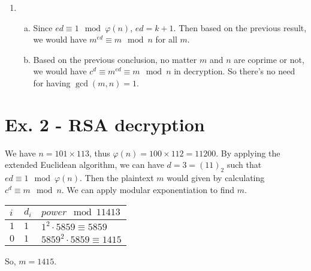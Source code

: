 \documentclass[11pt,a4paper]{article}
\begin{document}
\begin{enumerate}
\item \begin{enumerate}[a)]
\item Since $ed \equiv 1 \mod \varphi(n)$, $ed = k + 1$. Then based on the previous result, we would have $m^{ed} \equiv m \mod n$ for all $m$.

\item Based on the previous conclusion, no matter $m$ and $n$ are coprime or not, we would have $c^{d} \equiv m^{ed} \equiv m \mod n$ in decryption. So there's no need for having $\gcd(m,n) = 1$.
\end{enumerate}
\end{enumerate}



\section*{Ex. 2 - RSA decryption}
\par We have $n = 101 \times 113$, thus $\varphi(n) = 100 \times 112 = 11200$. By applying the extended Euclidean algorithm, we can have $d = 3 = (11)_{2}$ such that $ed \equiv 1 \mod \varphi(n)$. Then the plaintext $m$ would given by calculating $c^{d} \equiv m \mod n$. We can apply modular exponentiation to find $m$.
\begin{table}[!ht]
	\centering
	\begin{tabular}{l|l|l}
		$i$ & $d_{i}$ & $power \mod 11413$ \\
		\hline
		$1$ & $1$ & $1^{2} \cdot 5859 \equiv 5859$ \\
		$0$ & $1$ & $5859^{2} \cdot 5859 \equiv 1415$
	\end{tabular}
\end{table}
\par So, $m = 1415$.
\end{document}
